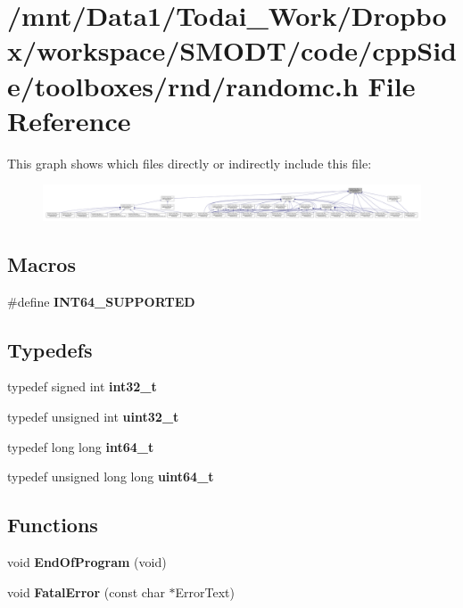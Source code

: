 \section{/mnt/\-Data1/\-Todai\-\_\-\-Work/\-Dropbox/workspace/\-S\-M\-O\-D\-T/code/cpp\-Side/toolboxes/rnd/randomc.h File Reference}
\label{toolboxes_2rnd_2randomc_8h}
This graph shows which files directly or indirectly include this file\-:\nopagebreak
\begin{figure}[H]
\begin{center}
\leavevmode
\includegraphics[width=350pt]{toolboxes_2rnd_2randomc_8h__dep__incl}
\end{center}
\end{figure}
\subsection*{Macros}
\begin{DoxyCompactItemize}
\item 
\#define {\bf I\-N\-T64\-\_\-\-S\-U\-P\-P\-O\-R\-T\-E\-D}
\end{DoxyCompactItemize}
\subsection*{Typedefs}
\begin{DoxyCompactItemize}
\item 
typedef signed int {\bf int32\-\_\-t}
\item 
typedef unsigned int {\bf uint32\-\_\-t}
\item 
typedef long long {\bf int64\-\_\-t}
\item 
typedef unsigned long long {\bf uint64\-\_\-t}
\end{DoxyCompactItemize}
\subsection*{Functions}
\begin{DoxyCompactItemize}
\item 
void {\bf End\-Of\-Program} (void)
\item 
void {\bf Fatal\-Error} (const char $\ast$Error\-Text)
\end{DoxyCompactItemize}


